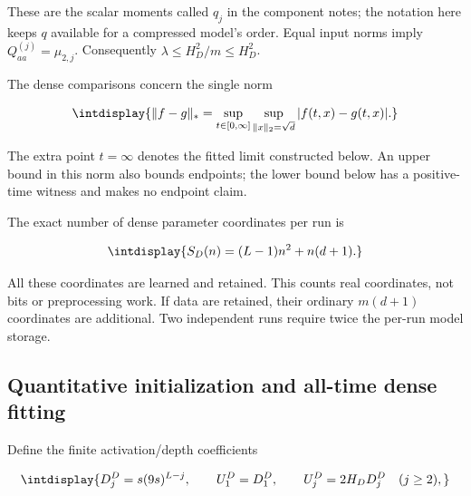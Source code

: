 
These are the scalar moments called \(q_j\) in the component notes; the notation here keeps \(q\) available for a compressed model's order. Equal input norms imply \(Q^{(j)}_{aa}=\mu_{2,\allowbreak j}\). Consequently \(\lambda\le H_D^2/m\le H_D^2\).



The dense comparisons concern the single norm


\begingroup\renewcommand{\theHequation}{intdisplay.42}
\begin{equation*}
\intdisplay{
\|f-g\|_*=
\sup_{t\in[0,\infty]}\sup_{\|x\|_2=\sqrt d}|f(t,x)-g(t,x)|.
}
\end{equation*}
\endgroup


The extra point \(t=\infty\) denotes the fitted limit constructed below. An upper bound in this norm also bounds endpoints; the lower bound below has a positive-time witness and makes no endpoint claim.



The exact number of dense parameter coordinates per run is


\begingroup\renewcommand{\theHequation}{intdisplay.43}
\begin{equation*}
\intdisplay{
S_D(n)=(L-1)n^2+n(d+1).
}
\end{equation*}
\endgroup


All these coordinates are learned and retained. This counts real coordinates, not bits or preprocessing work. If data are retained, their ordinary \(m(d+1)\) coordinates are additional. Two independent runs require twice the per-run model storage.


\subsection{Quantitative initialization and all-time dense fitting}
\label{int:dense-fitting}


Define the finite activation/depth coefficients


\begingroup\renewcommand{\theHequation}{intdisplay.44}
\begin{equation*}
\intdisplay{
D_j^D=s(9s)^{L-j},\qquad U_1^D=D_1^D,\qquad
U_j^D=2H_DD_j^D\quad(j\ge2),
}
\end{equation*}
\endgroup

